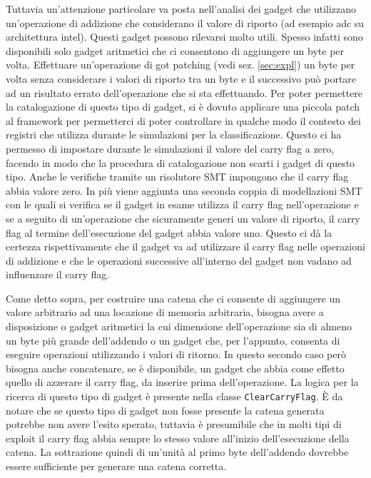 Tuttavia un'attenzione particolare va posta nell'analisi dei gadget
che utilizzano un'operazione di addizione che considerano il valore di
riporto (ad esempio adc su architettura intel). Questi gadget possono
rilevarsi molto utili. Spesso infatti sono disponibili solo gadget
aritmetici che ci consentono di aggiungere un byte per
volta. Effettuare un'operazione di got patching (vedi
sez. \ref{sec:expl}) un byte per volta senza considerare i valori di
riporto tra un byte e il successivo può portare ad un risultato errato
dell'operazione che si sta effettuando. Per poter permettere la
catalogazione di questo tipo di gadget, si è dovuto applicare una
piccola patch al framework per permetterci di poter controllare in
qualche modo il contesto dei registri che utilizza durante le
simulazioni per la classificazione. Questo ci ha permesso di impostare
durante le simulazioni il valore del carry flag a zero, facendo in
modo che la procedura di catalogazione non scarti i gadget di questo
tipo. Anche le verifiche tramite un risolutore SMT impongono che il
carry flag abbia valore zero. In più viene aggiunta una seconda coppia
di modellazioni SMT con le quali si verifica se il gadget in esame
utilizza il carry flag nell'operazione e se a seguito di un'operazione
che sicuramente generi un valore di riporto, il carry flag al termine
dell'esecuzione del gadget abbia valore uno. Questo ci dà la certezza
rispettivamente che il gadget va ad utilizzare il carry flag nelle
operazioni di addizione e che le operazioni successive all'interno del
gadget non vadano ad influenzare il carry flag.

Come detto sopra, per costruire una catena che ci consente di
aggiungere un valore arbitrario ad una locazione di memoria
arbitraria, bisogna avere a disposizione o gadget aritmetici la cui
dimensione dell'operazione sia di almeno un byte più grande
dell'addendo o un gadget che, per l'appunto, consenta di eseguire
operazioni utilizzando i valori di ritorno. In questo secondo caso
però bisogna anche concatenare, se è disponibile, un gadget che abbia
come effetto quello di azzerare il carry flag, da inserire prima
dell'operazione. La logica per la ricerca di questo tipo di gadget è
presente nella classe \lstinline{ClearCarryFlag}. È da notare che se
questo tipo di gadget non fosse presente la catena generata potrebbe
non avere l'esito sperato, tuttavia è presumibile che in molti tipi di
exploit il carry flag abbia sempre lo stesso valore all'inizio
dell'esecuzione della catena. La sottrazione quindi di un'unità al
primo byte dell'addendo dovrebbe essere sufficiente per generare una
catena corretta. 

